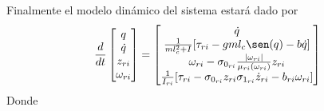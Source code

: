 \documentclass[a4paper]{IEEEtran} %
\begin{document}
Finalmente el modelo dinámico del sistema estará dado por 
\begin{equation}
    \frac{d}{dt}\begin{bmatrix}
        q \\ \dot{q}\\ {z}_{ri} \\ \omega_{ri}
    \end{bmatrix}=\begin{bmatrix}
        \dot{q}\\ \frac{1}{ml_c^2+I}\lbrack \tau_{ri}-gml_c\sen(q)-b\dot{q} \rbrack \\ \omega_{ri}-\sigma_{0_{ri}}\frac{|\omega_{ri}|}{\mu_{ri}(\omega_{ri})}z_{ri}\\ \frac{1}{I_{ri}}\lbrack \tau_{ri}-\sigma_{0_{ri}}z_{ri}\sigma_{1_{ri}}\dot{z}_{ri}-b_{ri}\omega_{ri}\rbrack
    \end{bmatrix}
    \label{eq:sys_din_model}
\end{equation}
Donde 


\end{document}
